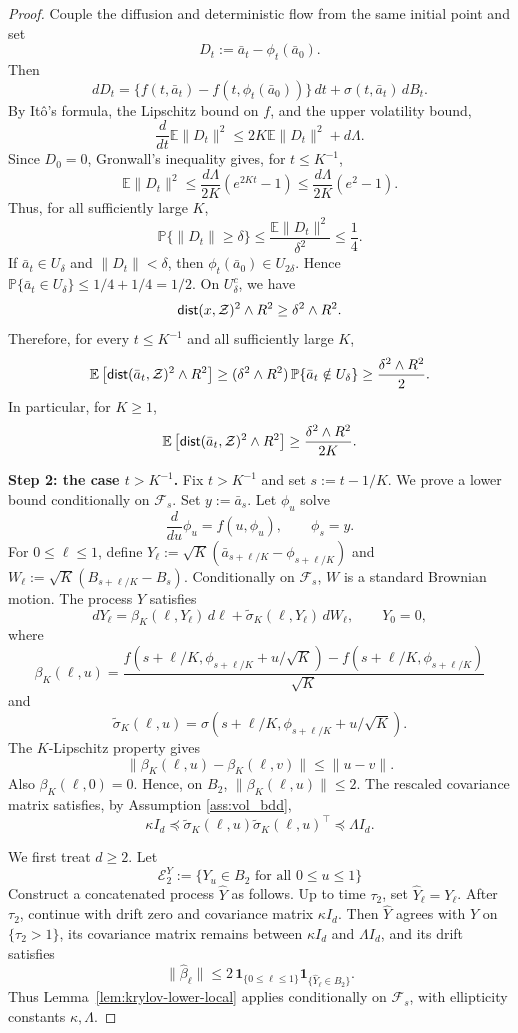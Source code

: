 \documentclass{article}
\newcommand{\1}{\mathbbm{1}}
\newcommand{\dist}{{\sf dist}}
\numberwithin{equation}{section}
\begin{document}
\begin{proof}
Couple the diffusion and deterministic flow from the same initial point and set
$$
D_t:=\bar a_t-\phi_t(\bar a_0).
$$
Then
$$
dD_t
=
\{f(t,\bar a_t)-f(t,\phi_t(\bar a_0))\}\,dt
+
\sigma(t,\bar a_t)\,dB_t.
$$
By Itô's formula, the Lipschitz bound on $f$, and the upper volatility bound,
$$
\frac{d}{dt}\mathbb E\|D_t\|^2
\le
2K\mathbb E\|D_t\|^2+d\Lambda.
$$
Since $D_0=0$, Gronwall's inequality gives, for $t\le K^{-1}$,
$$
\mathbb E\|D_t\|^2
\le
\frac{d\Lambda}{2K}(e^{2Kt}-1)
\le
\frac{d\Lambda}{2K}(e^2-1).
$$
Thus, for all sufficiently large $K$,
$$
\mathbb P\{\|D_t\|\ge \delta\}
\le
\frac{\mathbb E\|D_t\|^2}{\delta^2}
\le
\frac14.
$$
If $\bar a_t\in U_\delta$ and $\|D_t\|<\delta$, then
$
\phi_t(\bar a_0)\in U_{2\delta}.
$
Hence
$
\mathbb P\{\bar a_t\in U_\delta\}
\le 1/4+1/4
=
1/2.
$
On $U_\delta^c$, we have
$$
\dist(x,\mathcal{Z})^2\wedge R^2
\ge
\delta^2\wedge R^2.
$$
Therefore, for every $t\le K^{-1}$ and all sufficiently large $K$,
$$
\mathbb E\left[\dist(\bar a_t, \mathcal{Z})^2\wedge R^2\right]
\ge
(\delta^2\wedge R^2)\,
\mathbb P\{\bar a_t\notin U_\delta\}
\ge
\frac{\delta^2\wedge R^2}{2}.
$$
In particular, for $K\ge 1$,
$$
\mathbb E\left[\dist(\bar a_t,\mathcal{Z})^2\wedge R^2\right]
\ge
\frac{\delta^2\wedge R^2}{2K}.
$$

\textbf{Step 2: the case $t>K^{-1}$.}
Fix $t>K^{-1}$ and set
$
s:=t-1/K.
$
We prove a lower bound conditionally on $\mathcal F_s$. Set
$
y:=\bar a_s.
$
Let $\phi_u$ solve
$$
\frac{d}{du}\phi_u=f(u,\phi_u),
\qquad
\phi_s=y.
$$
For $0\le \ell\le 1$, define
$
Y_\ell
:=
\sqrt K
\left(
\bar a_{s+\ell/K}-\phi_{s+\ell/K}
\right)
$ and 
$
W_\ell
:=
\sqrt K
\left(
B_{s+\ell/K}-B_s
\right)
$.
Conditionally on $\mathcal F_s$, $W$ is a standard Brownian motion. The
process $Y$ satisfies
$$
dY_\ell
=
\beta_K(\ell,Y_\ell)\,d\ell
+
\widetilde\sigma_K(\ell,Y_\ell)\,dW_\ell,
\qquad
Y_0=0,
$$
where
$$
\beta_K(\ell,u)
=
\frac{
f(s+\ell/K,\phi_{s+\ell/K}+u/\sqrt K)
-
f(s+\ell/K,\phi_{s+\ell/K})
}{\sqrt K}
$$
and
$$
\widetilde\sigma_K(\ell,u)
=
\sigma(s+\ell/K,\phi_{s+\ell/K}+u/\sqrt K).
$$
The $K$-Lipschitz property gives
$$
\|\beta_K(\ell,u)-\beta_K(\ell,v)\|
\le
\|u-v\|.
$$
Also $\beta_K(\ell,0)=0$. Hence, on $B_2$,
$
\|\beta_K(\ell,u)\|\le 2.
$
The rescaled covariance matrix satisfies, by Assumption \ref{ass:vol_bdd},
$$
\kappa I_d
\preceq
\widetilde\sigma_K(\ell,u)\widetilde\sigma_K(\ell,u)^\top
\preceq
\Lambda I_d .
$$

We first treat $d\ge 2$. Let
$$
\mathcal{E}_{2}^{Y}:=\{Y_{u}\in B_{2}\text{ for all }0\leq u\leq 1\}
$$
Construct a concatenated process $\widehat Y$ as follows. Up to time
$\tau_2$, set $\widehat Y_\ell=Y_\ell$. After $\tau_2$, continue with drift
zero and covariance matrix $\kappa I_d$. Then $\widehat Y$ agrees with $Y$ on
$\{\tau_2>1\}$, its covariance matrix remains between $\kappa I_d$ and
$\Lambda I_d$, and its drift satisfies
$$
\|\widehat \beta_\ell\|
\le
2\,\mathbf 1_{\{0\le \ell\le 1\}}\mathbf 1_{\{\widehat Y_\ell\in B_2\}} .
$$
Thus Lemma~\ref{lem:krylov-lower-local} applies conditionally on
$\mathcal F_s$, with ellipticity constants $\kappa,\Lambda$.


\end{proof}
\end{document}
